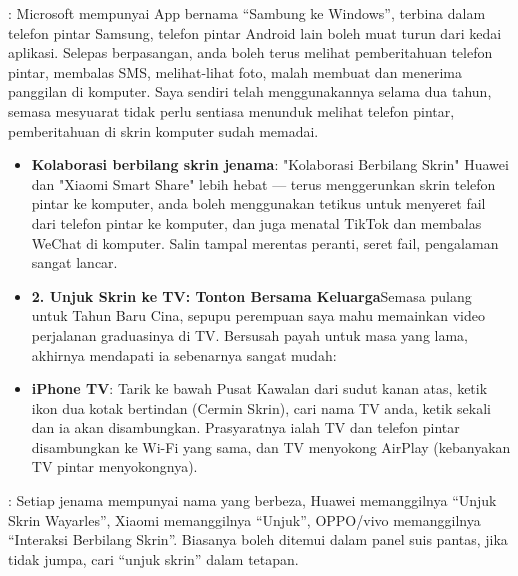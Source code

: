 


: Microsoft mempunyai App bernama “Sambung ke Windows”, terbina dalam telefon pintar Samsung, telefon pintar Android lain boleh muat turun dari kedai aplikasi. Selepas berpasangan, anda boleh terus melihat pemberitahuan telefon pintar, membalas SMS, melihat-lihat foto, malah membuat dan menerima panggilan di komputer. Saya sendiri telah menggunakannya selama dua tahun, semasa mesyuarat tidak perlu sentiasa menunduk melihat telefon pintar, pemberitahuan di skrin komputer sudah memadai.

\begin{itemize}
  \item \textbf{Kolaborasi berbilang skrin jenama}: "Kolaborasi Berbilang Skrin" Huawei dan "Xiaomi Smart Share" lebih hebat — terus menggerunkan skrin telefon pintar ke komputer, anda boleh menggunakan tetikus untuk menyeret fail dari telefon pintar ke komputer, dan juga menatal TikTok dan membalas WeChat di komputer. Salin tampal merentas peranti, seret fail, pengalaman sangat lancar.
  \item \textbf{2. Unjuk Skrin ke TV: Tonton Bersama Keluarga}Semasa pulang untuk Tahun Baru Cina, sepupu perempuan saya mahu memainkan video perjalanan graduasinya di TV. Bersusah payah untuk masa yang lama, akhirnya mendapati ia sebenarnya sangat mudah:
  \item \textbf{iPhone TV}: Tarik ke bawah Pusat Kawalan dari sudut kanan atas, ketik ikon dua kotak bertindan (Cermin Skrin), cari nama TV anda, ketik sekali dan ia akan disambungkan. Prasyaratnya ialah TV dan telefon pintar disambungkan ke Wi-Fi yang sama, dan TV menyokong AirPlay (kebanyakan TV pintar menyokongnya).
\end{itemize}


: Setiap jenama mempunyai nama yang berbeza, Huawei memanggilnya “Unjuk Skrin Wayarles”, Xiaomi memanggilnya “Unjuk”, OPPO/vivo memanggilnya “Interaksi Berbilang Skrin”. Biasanya boleh ditemui dalam panel suis pantas, jika tidak jumpa, cari “unjuk skrin” dalam tetapan.

